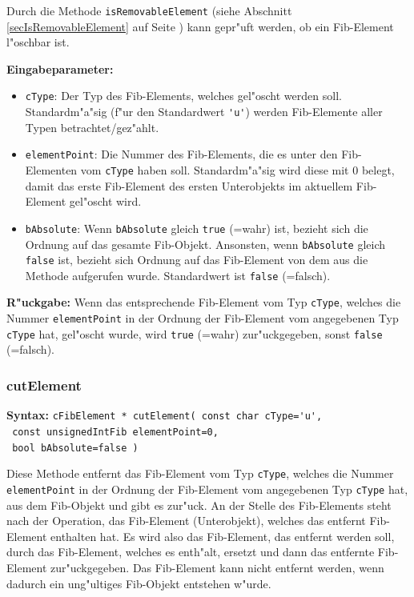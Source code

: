 Durch die Methode \verb|isRemovableElement| (siehe Abschnitt \ref{secIsRemovableElement} auf Seite \pageref{secIsRemovableElement} ) kann gepr"uft werden, ob ein Fib-Element l"oschbar ist.

\bigskip\noindent
\textbf{Eingabeparameter:} 
\begin{itemize}
 \item \verb|cType|: Der Typ des Fib-Elements, welches gel"oscht werden soll. Standardm"a"sig (f"ur den Standardwert \verb|'u'|) werden Fib-Elemente aller Typen betrachtet/gez"ahlt.
 \item \verb|elementPoint|: Die Nummer des Fib-Elements, die es unter den Fib-Elementen vom \verb|cType| haben soll. Standardm"a"sig wird diese mit $0$ belegt, damit das erste Fib-Element des ersten Unterobjekts im aktuellem Fib-Element gel"oscht wird.
 \item \verb|bAbsolute|: Wenn \verb|bAbsolute| gleich \verb|true| (=wahr) ist, bezieht sich die Ordnung auf das gesamte Fib-Objekt. Ansonsten, wenn \verb|bAbsolute| gleich \verb|false| ist, bezieht sich Ordnung auf das Fib-Element von dem aus die Methode aufgerufen wurde. Standardwert ist \verb|false| (=falsch).
\end{itemize}

\bigskip\noindent
\textbf{R"uckgabe:} Wenn das entsprechende Fib-Element vom Typ \verb|cType|, welches die Nummer \verb|elementPoint| in der Ordnung der Fib-Element vom angegebenen Typ \verb|cType| hat, gel"oscht wurde, wird \verb|true| (=wahr) zur"uckgegeben, sonst \verb|false| (=falsch).


\subsubsection{cutElement}

\textbf{Syntax:} \verb|cFibElement * cutElement( const char cType='u', | \\\verb| const unsignedIntFib elementPoint=0,| \\\verb| bool bAbsolute=false )|

\bigskip\noindent
Diese Methode entfernt das Fib-Element vom Typ \verb|cType|, welches die Nummer \verb|elementPoint| in der Ordnung der Fib-Element vom angegebenen Typ \verb|cType| hat, aus dem Fib-Objekt und gibt es zur"uck. An der Stelle des Fib-Elements steht nach der Operation, das Fib-Element (Unterobjekt), welches das entfernt Fib-Element enthalten hat. Es wird also das Fib-Element, das entfernt werden soll, durch das Fib-Element, welches es enth"alt, ersetzt und dann das entfernte Fib-Element zur"uckgegeben. Das Fib-Element kann nicht entfernt werden, wenn dadurch ein ung"ultiges Fib-Objekt entstehen w"urde.

